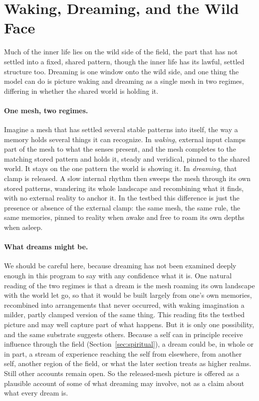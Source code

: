 \section{Waking, Dreaming, and the Wild Face}
\label{sec:dreams}

Much of the inner life lies on the wild side of the field, the part that has not settled into a
fixed, shared pattern, though the inner life has its lawful, settled structure too. Dreaming is
one window onto the wild side, and one thing the model can do is picture waking and dreaming as a
single mesh in two regimes, differing in whether the shared world is holding it.

\paragraph{One mesh, two regimes.}
Imagine a mesh that has settled several stable patterns into itself, the way a memory holds
several things it can recognize. In \emph{waking}, external input clamps part of the mesh to
what the senses present, and the mesh completes to the matching stored pattern and holds it,
steady and veridical, pinned to the shared world. It stays on the one pattern the world is
showing it. In \emph{dreaming}, that clamp is released. A slow internal rhythm then sweeps the
mesh through its own stored patterns, wandering its whole landscape and recombining what it
finds, with no external reality to anchor it. In the testbed this difference is just the
presence or absence of the external clamp: the same mesh, the same rule, the same memories,
pinned to reality when awake and free to roam its own depths when asleep.

\paragraph{What dreams might be.}
We should be careful here, because dreaming has not been examined deeply enough in this program
to say with any confidence what it is. One natural reading of the two regimes is that a dream is
the mesh roaming its own landscape with the world let go, so that it would be built largely from
one's own memories, recombined into arrangements that never occurred, with waking imagination a
milder, partly clamped version of the same thing. This reading fits the testbed picture and may
well capture part of what happens. But it is only one possibility, and the same substrate
suggests others. Because a self can in principle receive influence through the field
(Section~\ref{sec:spiritual}), a dream could be, in whole or in part, a stream of experience
reaching the self from elsewhere, from another self, another region of the field, or what the
later section treats as higher realms. Still other accounts remain open. So the released-mesh
picture is offered as a plausible account of some of what dreaming may involve, not as a claim
about what every dream is.

